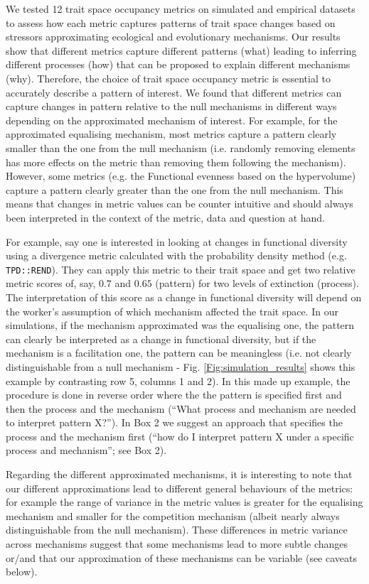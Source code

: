 \documentclass[12pt,letterpaper]{article}
\begin{document}
We tested 12 trait space occupancy metrics on simulated and empirical datasets to assess how each metric captures patterns of trait space changes based on stressors approximating ecological and evolutionary mechanisms.
Our results show that different metrics capture different patterns (what) leading to inferring different processes (how) that can be proposed to explain different mechanisms (why).
Therefore, the choice of trait space occupancy metric is essential to accurately describe a pattern of interest.
We found that different metrics can capture changes in pattern relative to the null mechanisms in different ways depending on the approximated mechanism of interest.
For example, for the approximated equalising mechanism, most metrics capture a pattern clearly smaller than the one from the null mechanism (i.e. randomly removing elements has more effects on the metric than removing them following the mechanism).
However, some metrics (e.g. the Functional evenness based on the hypervolume) capture a pattern clearly greater than the one from the null mechanism.
This means that changes in metric values can be counter intuitive and should always been interpreted in the context of the metric, data and question at hand.

For example, say one is interested in looking at changes in functional diversity using a divergence metric calculated with the probability density method (e.g. \texttt{TPD::REND}).
They can apply this metric to their trait space and get two relative metric scores of, say, $0.7$ and $0.65$ (pattern) for two levels of extinction (process).
The interpretation of this score as a change in functional diversity will depend on the worker's assumption of which mechanism affected the trait space.
In our simulations, if the mechanism approximated was the equalising one, the pattern can clearly be interpreted as a change in functional diversity, but if the mechanism is a facilitation one, the pattern can be meaningless (i.e. not clearly distinguishable from a null mechanism - Fig. \ref{Fig:simulation_results} shows this example by contrasting row 5, columns 1 and 2).
In this made up example, the procedure is done in reverse order where the the pattern is specified first and then the process and the mechanism (``What process and mechanism are needed to interpret pattern X?'').
In Box 2 we suggest an approach that specifies the process and the mechanism first (``how do I interpret pattern X under a specific process and mechanism''; see Box 2).

Regarding the different approximated mechanisms, it is interesting to note that our different approximations lead to different general behaviours of the metrics: for example the range of variance in the metric values is greater for the equalising mechanism and smaller for the competition mechanism (albeit nearly always distinguishable from the null mechanism).
These differences in metric variance across mechanisms suggest that some mechanisms lead to more subtle changes or/and that our approximation of these mechanisms can be variable (see caveats below).
\end{document}
